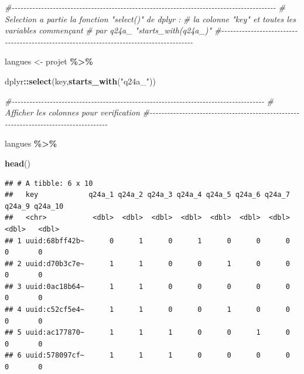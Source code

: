 \documentclass[
]{article}
\newenvironment{Shaded}{\begin{snugshade}}{\end{snugshade}}
\newcommand{\CommentTok}[1]{\textcolor[rgb]{0.56,0.35,0.01}{\textit{#1}}}
\newcommand{\FunctionTok}[1]{\textcolor[rgb]{0.13,0.29,0.53}{\textbf{#1}}}
\newcommand{\NormalTok}[1]{#1}
\newcommand{\OtherTok}[1]{\textcolor[rgb]{0.56,0.35,0.01}{#1}}
\newcommand{\SpecialCharTok}[1]{\textcolor[rgb]{0.81,0.36,0.00}{\textbf{#1}}}
\newcommand{\StringTok}[1]{\textcolor[rgb]{0.31,0.60,0.02}{#1}}
\begin{document}
\begin{Shaded}
\begin{Highlighting}[]
\CommentTok{\#{-}{-}{-}{-}{-}{-}{-}{-}{-}{-}{-}{-}{-}{-}{-}{-}{-}{-}{-}{-}{-}{-}{-}{-}{-}{-}{-}{-}{-}{-}{-}{-}{-}{-}{-}{-}{-}{-}{-}{-}{-}{-}{-}{-}{-}{-}{-}{-}{-}{-}{-}{-}{-}{-}{-}{-}{-}{-}{-}{-}{-}{-}{-}{-}{-}{-}{-}{-}{-}{-}{-}{-}{-}{-}{-}{-}{-}{-}{-}{-}{-}{-}{-}{-}{-}{-}{-}{-}{-}{-}}
\CommentTok{\#     Selection a partie la fonction "select()" de dplyr :}
\CommentTok{\#       la colonne "key" et toutes les variables commençant }
\CommentTok{\#             par q24a\_ "starts\_with(q24a\_)"  }
\CommentTok{\#{-}{-}{-}{-}{-}{-}{-}{-}{-}{-}{-}{-}{-}{-}{-}{-}{-}{-}{-}{-}{-}{-}{-}{-}{-}{-}{-}{-}{-}{-}{-}{-}{-}{-}{-}{-}{-}{-}{-}{-}{-}{-}{-}{-}{-}{-}{-}{-}{-}{-}{-}{-}{-}{-}{-}{-}{-}{-}{-}{-}{-}{-}{-}{-}{-}{-}{-}{-}{-}{-}{-}{-}{-}{-}{-}{-}{-}{-}{-}{-}{-}{-}{-}{-}{-}{-}{-}{-}{-}{-}}

\NormalTok{langues }\OtherTok{\textless{}{-}}\NormalTok{ projet }\SpecialCharTok{\%\textgreater{}\%}
  
\NormalTok{  dplyr}\SpecialCharTok{::}\FunctionTok{select}\NormalTok{(key,}\FunctionTok{starts\_with}\NormalTok{(}\StringTok{"q24a\_"}\NormalTok{))}


\CommentTok{\#{-}{-}{-}{-}{-}{-}{-}{-}{-}{-}{-}{-}{-}{-}{-}{-}{-}{-}{-}{-}{-}{-}{-}{-}{-}{-}{-}{-}{-}{-}{-}{-}{-}{-}{-}{-}{-}{-}{-}{-}{-}{-}{-}{-}{-}{-}{-}{-}{-}{-}{-}{-}{-}{-}{-}{-}{-}{-}{-}{-}{-}{-}{-}{-}{-}{-}{-}{-}{-}{-}{-}{-}{-}{-}{-}{-}{-}{-}{-}{-}{-}{-}{-}{-}{-}{-}}
\CommentTok{\#     Afficher les colonnes pour verification}
\CommentTok{\#{-}{-}{-}{-}{-}{-}{-}{-}{-}{-}{-}{-}{-}{-}{-}{-}{-}{-}{-}{-}{-}{-}{-}{-}{-}{-}{-}{-}{-}{-}{-}{-}{-}{-}{-}{-}{-}{-}{-}{-}{-}{-}{-}{-}{-}{-}{-}{-}{-}{-}{-}{-}{-}{-}{-}{-}{-}{-}{-}{-}{-}{-}{-}{-}{-}{-}{-}{-}{-}{-}{-}{-}{-}{-}{-}{-}{-}{-}{-}{-}{-}{-}{-}{-}{-}{-}}

\NormalTok{langues }\SpecialCharTok{\%\textgreater{}\%}
  
  \FunctionTok{head}\NormalTok{()}
\end{Highlighting}
\end{Shaded}

\begin{verbatim}
## # A tibble: 6 x 10
##   key            q24a_1 q24a_2 q24a_3 q24a_4 q24a_5 q24a_6 q24a_7 q24a_9 q24a_10
##   <chr>           <dbl>  <dbl>  <dbl>  <dbl>  <dbl>  <dbl>  <dbl>  <dbl>   <dbl>
## 1 uuid:68bff42b~      0      1      0      1      0      0      0      0       0
## 2 uuid:d70b3c7e~      1      1      0      0      1      0      0      0       0
## 3 uuid:0ac18b64~      1      1      0      0      0      0      0      0       0
## 4 uuid:c52cf5e4~      1      1      0      0      1      0      0      0       0
## 5 uuid:ac177870~      1      1      1      0      0      1      0      0       0
## 6 uuid:578097cf~      1      1      1      0      0      0      0      0       0
\end{verbatim}
\end{document}
